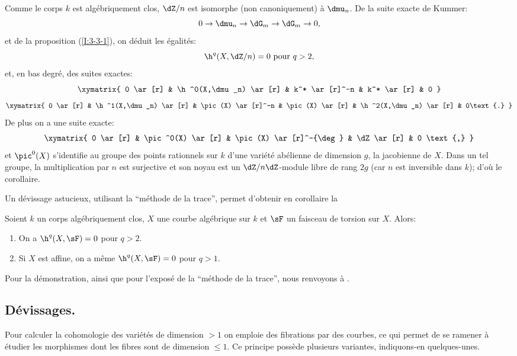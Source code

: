 Comme le corps $k$ est algébriquement clos, $\dZ/n$ est isomorphe (non 
canoniquement) à $\dmu_n$. De la suite exacte de Kummer:
\[
  0 \to \dmu_n \to \dG_m \to \dG_m \to 0\text{,}
\]
et de la proposition (\ref{I:3-3-1}), on déduit les égalités:
\[
  \h^q(X,\dZ/n) = 0 \text{ pour $q>2$,}
\]
et, en bas degré, des suites exactes:
\[\xymatrix{
  0 \ar[r] 
    & \h^0(X,\dmu_n) \ar[r] 
    & k^* \ar[r]^-n 
    & k^* \ar[r] 
    & 0
}\]
\[\xymatrix{
  0 \ar[r] 
    & \h^1(X,\dmu_n) \ar[r] 
    & \pic(X) \ar[r]^-n 
    & \pic(X) \ar[r] 
    & \h^2(X,\dmu_n) \ar[r] 
    & 0\text{.}
}\]
De plus on a une suite exacte:
\[\xymatrix{
  0 \ar[r] 
    & \pic^0(X) \ar[r] 
    & \pic(X) \ar[r]^-{\deg}
    & \dZ \ar[r] 
    & 0 \text{,}
}\]
et $\pic^0(X)$ s'identifie au groupe des points rationnels sur $k$ d'une 
variété abélienne de dimension $g$, la jacobienne de $X$. Dans un tel 
groupe, la multiplication par $n$ est surjective et son noyau est un 
$\dZ/n\dZ$-module libre de rang $2g$ (car $n$ est inversible dans $k$); d'où 
le corollaire. 

Un dévissage astucieux, utilisant la ``méthode de la trace'', permet 
d'obtenir en corollaire la 





\begin{propositiondotdash}\label{I:3-3-6}
Soient $k$ un corps algébriquement clos, $X$ une courbe algébrique sur $k$ 
et $\sF$ un faisceau de torsion sur $X$. Alors:
\begin{enumerate}[\indent i)]
  \item On a $\h^q(X,\sF) = 0$ pour $q>2$.
  \item Si $X$ est affine, on a même $\h^q(X,\sF) = 0$ pour $q>1$.
\end{enumerate}
\end{propositiondotdash}

Pour la démonstration, ainsi que pour l'exposé de la ``méthode de la 
trace'', nous renvoyons à .










\subsection{Dévissages.}\label{I:3-4}

Pour calculer la cohomologie des variétés de dimension $>1$ on emploie des 
fibrations par des courbes, ce qui permet de se ramener à étudier les 
morphismes dont les fibres sont de dimension $\leqslant 1$. Ce principe 
possède plusieurs variantes, indiquons-en quelques-unes.





